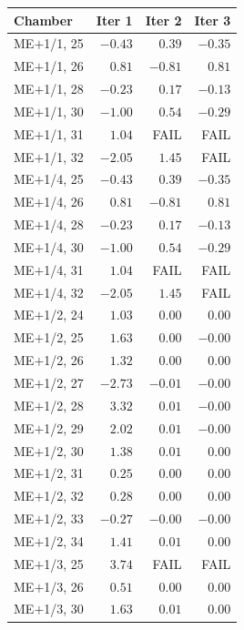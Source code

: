 \documentclass[compress]{beamer}
\begin{document}
\tiny

\begin{frame}
\begin{columns}
\begin{tabular}{l r r r}
Chamber & Iter 1 & Iter 2 & Iter 3 \\\hline
ME$+$1/1, 25 &  $-0.43$ &  $ 0.39$ &  $-0.35$ \\
ME$+$1/1, 26 &  $ 0.81$ &  $-0.81$ &  $ 0.81$ \\
ME$+$1/1, 28 &  $-0.23$ &  $ 0.17$ &  $-0.13$ \\
ME$+$1/1, 30 &  $-1.00$ &  $ 0.54$ &  $-0.29$ \\
ME$+$1/1, 31 &  $ 1.04$ &  FAIL &  FAIL \\
ME$+$1/1, 32 &  $-2.05$ &  $ 1.45$ &  FAIL \\
ME$+$1/4, 25 &  $-0.43$ &  $ 0.39$ &  $-0.35$ \\
ME$+$1/4, 26 &  $ 0.81$ &  $-0.81$ &  $ 0.81$ \\
ME$+$1/4, 28 &  $-0.23$ &  $ 0.17$ &  $-0.13$ \\
ME$+$1/4, 30 &  $-1.00$ &  $ 0.54$ &  $-0.29$ \\
ME$+$1/4, 31 &  $ 1.04$ &  FAIL &  FAIL \\
ME$+$1/4, 32 &  $-2.05$ &  $ 1.45$ &  FAIL \\
ME$+$1/2, 24 &  $ 1.03$ &  $ 0.00$ &  $ 0.00$ \\
ME$+$1/2, 25 &  $ 1.63$ &  $ 0.00$ &  $-0.00$ \\
ME$+$1/2, 26 &  $ 1.32$ &  $ 0.00$ &  $ 0.00$ \\
ME$+$1/2, 27 &  $-2.73$ &  $-0.01$ &  $-0.00$ \\
ME$+$1/2, 28 &  $ 3.32$ &  $ 0.01$ &  $-0.00$ \\
ME$+$1/2, 29 &  $ 2.02$ &  $ 0.01$ &  $-0.00$ \\
ME$+$1/2, 30 &  $ 1.38$ &  $ 0.01$ &  $ 0.00$ \\
ME$+$1/2, 31 &  $ 0.25$ &  $ 0.00$ &  $ 0.00$ \\
ME$+$1/2, 32 &  $ 0.28$ &  $ 0.00$ &  $ 0.00$ \\
ME$+$1/2, 33 &  $-0.27$ &  $-0.00$ &  $-0.00$ \\
ME$+$1/2, 34 &  $ 1.41$ &  $ 0.01$ &  $ 0.00$ \\
ME$+$1/3, 25 &  $ 3.74$ &  FAIL &  FAIL \\
ME$+$1/3, 26 &  $ 0.51$ &  $ 0.00$ &  $ 0.00$ \\
ME$+$1/3, 30 &  $ 1.63$ &  $ 0.01$ &  $ 0.00$ \\

\end{tabular}
\end{columns}
\end{frame}
\end{document}
